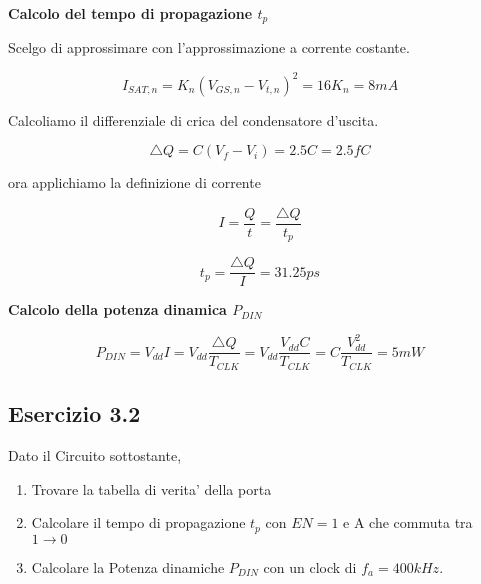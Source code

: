 \documentclass[\main/main.tex]{subfiles}
\begin{document}
\textbf{Calcolo del tempo di propagazione $t_p$}

Scelgo di approssimare con l'approssimazione a corrente costante.

\[I_{SAT,n} = K_n \left( V_{GS,n} - V_{t,n} \right)^2 = 16 K_n = 8mA\]

Calcoliamo il differenziale di crica del condensatore d'uscita.

\[ \triangle Q = C \left( V_f  - V_i\right) = 2.5 C = 2.5 fC\]

ora applichiamo la definizione di corrente

\[ I = \frac{Q}{t} = \frac{\triangle Q}{t_p} \]

\[ t_p = \frac{\triangle Q}{I} = 31.25 ps \]


\textbf{Calcolo della potenza dinamica $P_{DIN}$}

\[ P_{DIN} = V_{dd} I = V_{dd} \frac{\triangle Q}{T_{CLK}} = V_{dd} \frac{V_{dd} C }{T_{CLK}} = C \frac{V_{dd}^2}{T_{CLK}} = 5mW\]



\clearpage
\subsection{Esercizio 3.2}
Dato il Circuito sottostante,
\begin{enumerate}
	\item Trovare la tabella di verita' della porta
	\item Calcolare il tempo di propagazione  $t_p$  con $EN = 1$ e A che commuta tra $ 1 \rightarrow 0$
	\item Calcolare la Potenza dinamiche $P_{DIN}$ con un clock di $f_{a} = 400kHz$.
\end{enumerate}
\end{document}
